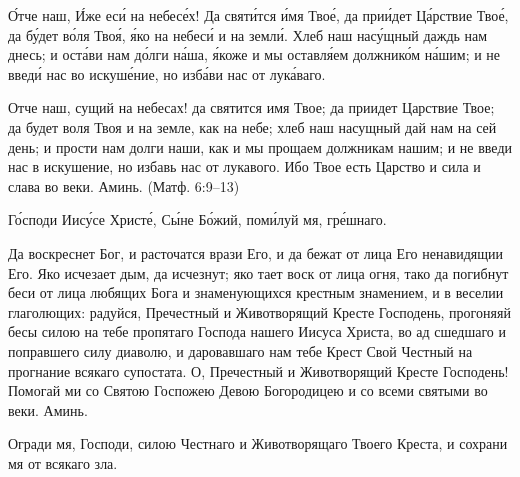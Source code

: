 

\label{_content_molitvi}

\begin{mymulticols}



\'{О}тче наш, \'{И}же ес\'{и} на небес\'{е}х! Да свят\'{и}тся \'{и}мя Тво\'{е}, да при\'{и}дет Ц\'{а}рствие Тво\'{е}, да б\'{у}дет в\'{о}ля Тво\'{я}, \'{я}ко на небес\'{и} и на земл\'{и}. Хлеб наш нас\'{у}щный даждь нам днесь; и ост\'{а}ви нам д\'{о}лги н\'{а}ша, \'{я}коже и мы оставл\'{я}ем должник\'{о}м н\'{а}шим; и не введ\'{и} нас во искуш\'{е}ние, но изб\'{а}ви нас от лук\'{а}ваго.

Отче наш, сущий на небесах! да святится имя Твое; да приидет Царствие Твое; да будет воля Твоя и на земле, как на небе; хлеб наш насущный дай нам на сей день; и прости нам долги наши, как и мы прощаем должникам нашим; и не введи нас в искушение, но избавь нас от лукавого. Ибо Твое есть Царство и сила и слава во веки. Аминь. (Матф. 6:9--13)


\end{mymulticols}

\mychapterending




{\centering Г\'{о}споди Иис\'{у}се Христ\'{е}, С\'{ы}не Б\'{о}жий, пом\'{и}луй мя, гр\'{е}шнаго.\par}

\mychapterending

\begin{mymulticols}



Да воскреснет Бог, и расточатся врази Его, и да бежат от лица Его ненавидящии Его. Яко исчезает дым, да исчезнут; яко тает воск от лица огня, тако да погибнут беси от лица любящих Бога и знаменующихся крестным знамением, и в веселии глаголющих: радуйся, Пречестный и Животворящий Кресте Господень, прогоняяй бесы силою на тебе пропятаго Господа нашего Иисуса Христа, во ад сшедшаго и поправшего силу диаволю, и даровавшаго нам тебе Крест Свой Честный на прогнание всякаго супостата. О, Пречестный и Животворящий Кресте Господень! Помогай ми со Святою Госпожею Девою Богородицею и со всеми святыми во веки. Аминь.


Огради мя, Господи, силою Честнаго и Животворящаго Твоего Креста, и сохрани мя от всякаго зла.

\end{mymulticols}

